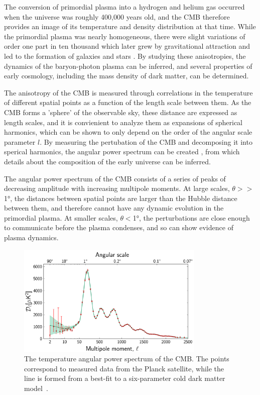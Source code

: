 The conversion of primordial plasma into a hydrogen and helium gas occurred when the universe was roughly 400,000 years old, and the CMB therefore provides an image of its temperature and density distribution at that time.
While the primordial plasma was nearly homogeneous, there were slight variations of order one part in ten thousand which later grew by gravitational attraction and led to the formation of galaxies and stars \cite{kurkisuonio}.
By studying these anisotropies, the dynamics of the baryon-photon plasma can be inferred, and several properties of early cosmology, including the mass density of dark matter, can be determined.

The anisotropy of the CMB is measured through correlations in the temperature of different spatial points as a function of the length scale between them. 
As the CMB forms a 'sphere' of the observable sky, these distance are expressed as length scales, and it is convienient to analyze them as expansions of spherical harmonics, which can be shown to only depend on the order of the angular scale parameter $l$. 
By measuring the pertubation of the CMB and decomposing it into sperical harmonics, the angular power spectrum can be created , from which details about the composition of the early universe can be inferred.

The angular power spectrum of the CMB consists of a series of peaks of decreasing amplitude with increasing multipole moments. 
At large scales, $\theta >> $\ang{1}, the distances between spatial points are larger than the Hubble distance between them, and therefore cannot have any dynamic evolution in the primordial plasma.
At smaller scales, $\theta < $\ang{1}, the perturbations are close enough to communicate before the plasma condenses, and so can show evidence of plasma dynamics.

\begin{figure}[htpb]
	\centering
	\includegraphics[width=0.8\textwidth]{figures/cmb_power_spectrum.png}
	\caption[The temperature angular power spectrum of the CMB]{The temperature angular power spectrum of the CMB. The points correspond to measured data from the Planck satellite, while the line is formed from a best-fit to a six-parameter cold dark matter model~\cite{PlanckCMB}.}
	\label{fig:CMBpowerSpectrum}
\end{figure}

